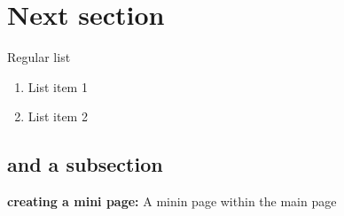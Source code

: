\section{Next section}
Regular list

\begin{enumerate}
\item List item 1
\item List item 2
\end{enumerate}



\subsection{and a subsection} 
\begin{minipage}{0.85\textwidth}
\textbf{creating a mini page:} A minin page within the main page
\end{minipage}




